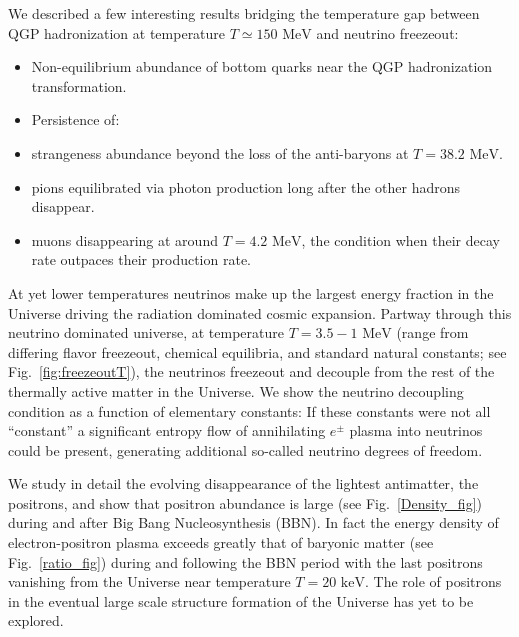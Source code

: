 \documentclass[universe,article,submit,moreauthors,pdftex,a4paper]{Definitions/mdpi}
\newcommand{\MeV}{\text{ MeV}}
\newcommand{\keV}{\text{ keV}}
\newcommand*{\rf}[1]{Fig.~{\ref{#1}}}
\begin{document}
We described a few interesting results bridging the temperature gap between QGP hadronization at temperature $T\simeq150\MeV$ and  neutrino freezeout:
\begin{itemize}
\item Non-equilibrium abundance of bottom quarks near the QGP hadronization transformation.
\item[] Persistence of:
\item strangeness abundance beyond the loss of the anti-baryons at $T=38.2\MeV$.
\item pions equilibrated via photon production long after the other hadrons disappear.
\item muons disappearing at around $T=4.2\MeV$, the condition when their decay rate outpaces their production rate.
\end{itemize}
At yet lower temperatures neutrinos make up the largest energy fraction in the Universe driving the radiation dominated cosmic expansion. Partway through this neutrino dominated universe, at temperature $T=3.5-1\MeV$ (range from differing flavor freezeout, chemical equilibria, and standard natural constants; see \rf{fig:freezeoutT}), the neutrinos freezeout and decouple from the rest of the thermally active matter in the Universe. We show the neutrino decoupling condition as a function of elementary constants: If these constants were not all ``constant'' a significant entropy flow of annihilating $e^{\pm}$ plasma into neutrinos could be present, generating additional so-called neutrino degrees of freedom.

We study in detail the evolving disappearance of the lightest antimatter, the positrons, and show that positron abundance is large  (see \rf{Density_fig}) during and after Big Bang Nucleosynthesis (BBN). In fact the energy density of electron-positron plasma exceeds greatly that of baryonic matter (see \rf{ratio_fig}) during and following the BBN period with the last positrons vanishing from the Universe near temperature $T=20\keV$. The role of positrons in the eventual large scale structure formation of the Universe has yet to be explored.
\end{document}
